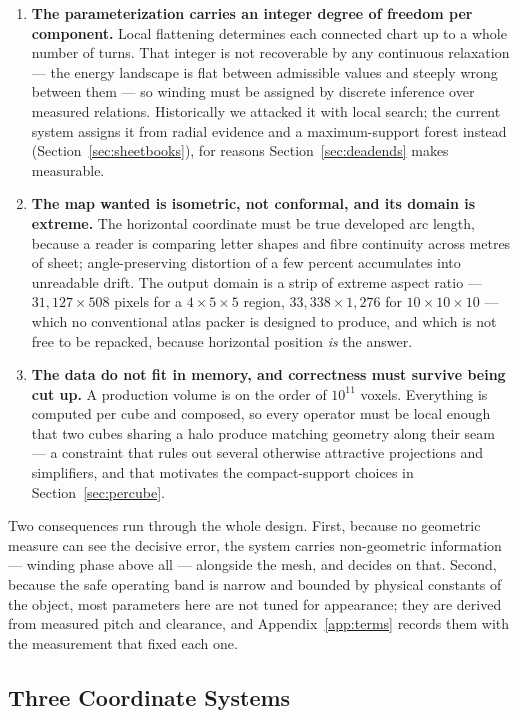 \begin{enumerate}
  \item \textbf{The parameterization carries an integer degree of freedom per component.} Local flattening determines each connected chart up to a whole number of turns. That integer is not recoverable by any continuous relaxation --- the energy landscape is flat between admissible values and steeply wrong between them --- so winding must be assigned by discrete inference over measured relations. Historically we attacked it with local search; the current system assigns it from radial evidence and a maximum-support forest instead (Section~\ref{sec:sheetbooks}), for reasons Section~\ref{sec:deadends} makes measurable.

  \item \textbf{The map wanted is isometric, not conformal, and its domain is extreme.} The horizontal coordinate must be true developed arc length, because a reader is comparing letter shapes and fibre continuity across metres of sheet; angle-preserving distortion of a few percent accumulates into unreadable drift. The output domain is a strip of extreme aspect ratio --- $31{,}127\times508$ pixels for a $4\times5\times5$ region, $33{,}338\times1{,}276$ for $10\times10\times10$ --- which no conventional atlas packer is designed to produce, and which is not free to be repacked, because horizontal position \emph{is} the answer.

  \item \textbf{The data do not fit in memory, and correctness must survive being cut up.} A production volume is on the order of $10^{11}$ voxels. Everything is computed per cube and composed, so every operator must be local enough that two cubes sharing a halo produce matching geometry along their seam --- a constraint that rules out several otherwise attractive projections and simplifiers, and that motivates the compact-support choices in Section~\ref{sec:percube}.
\end{enumerate}

Two consequences run through the whole design. First, because no geometric measure can see the decisive error, the system carries non-geometric information --- winding phase above all --- alongside the mesh, and decides on that. Second, because the safe operating band is narrow and bounded by physical constants of the object, most parameters here are not tuned for appearance; they are derived from measured pitch and clearance, and Appendix~\ref{app:terms} records them with the measurement that fixed each one.

\subsection{Three Coordinate Systems}
\label{sec:coords}


